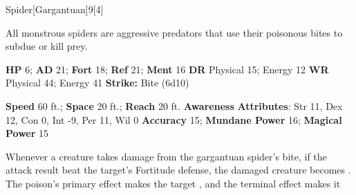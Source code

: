   \begin{monsection}{Spider}[Gargantuan]{9}[4]
    \vspace{-1em}\vspace{-1em}
    \vspace{0em}

    
    All monstrous spiders are aggressive predators that use their poisonous bites to subdue or kill prey.
  

    \begin{spellcontent}
      \begin{spelltargetinginfo}
        \pari \textbf{HP} 6;
          \textbf{AD} 21;
          \textbf{Fort} 18;
          \textbf{Ref} 21;
          \textbf{Ment} 16
        \pari \textbf{DR} Physical 15; Energy 12
        \pari \textbf{WR} Physical 44; Energy 41
        \pari \textbf{Strike:}
            Bite  (6d10)
      \end{spelltargetinginfo}
    \end{spellcontent}
    \begin{monsterfooter}
      \pari \textbf{Speed} 60 ft.;
        \textbf{Space} 20 ft.;
        \textbf{Reach} 20 ft.
      \pari \textbf{Awareness} 
      \pari \textbf{Attributes}:
        Str 11, Dex 12,
        Con 0, Int -9,
        Per 11, Wil 0
      \pari \textbf{Accuracy} 15;
        \textbf{Mundane Power} 16;
      \textbf{Magical Power} 15
    \end{monsterfooter}
  \end{monsection}
    Whenever a creature takes damage from the gargantuan spider's bite,
      if the attack result beat the target's Fortitude defense,
      the damaged creature becomes .
    The poison's primary effect makes the target , and the terminal effect makes it 
  
